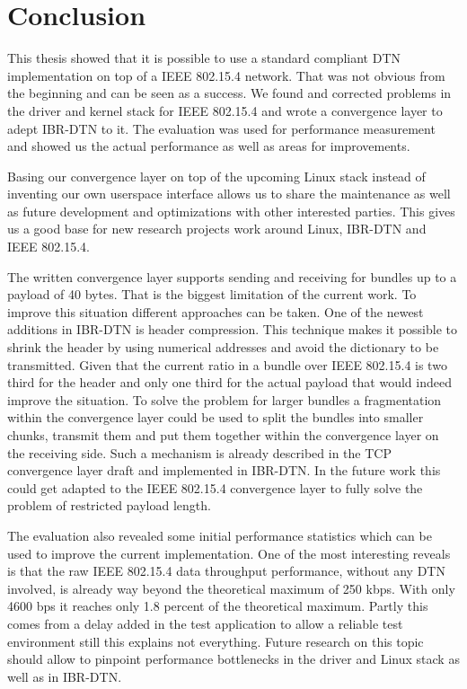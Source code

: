 \chapter{Conclusion}

This thesis showed that it is possible to use a standard compliant DTN
implementation on top of a IEEE 802.15.4 network. That was not obvious from the
beginning and can be seen as a success. We found and corrected problems in the
driver and kernel stack for IEEE 802.15.4 and wrote a convergence layer to adept
IBR-DTN to it. The evaluation was used for performance measurement and showed us
the actual performance as well as areas for improvements.

Basing our convergence layer on top of the upcoming Linux stack instead of
inventing our own userspace interface allows us to share the maintenance as well
as future development and optimizations with other interested parties. This
gives us a good base for new research projects work around Linux, IBR-DTN and
IEEE 802.15.4.

The written convergence layer supports sending and receiving for bundles up to a
payload of 40 bytes. That is the biggest limitation of the current work. To
improve this situation different approaches can be taken. One of the newest
additions in IBR-DTN is header compression. This technique makes it possible to
shrink the header by using numerical addresses and avoid the dictionary to be
transmitted. Given that the current ratio in a bundle over IEEE 802.15.4 is two
third for the header and only one third for the actual payload that would indeed
improve the situation. To solve the problem for larger bundles a fragmentation
within the convergence layer could be used to split the bundles into smaller
chunks, transmit them and put them together within the convergence layer on the
receiving side. Such a mechanism is already described in the TCP convergence
layer draft \cite{tcp-clayer-draft} and implemented in IBR-DTN. In the future
work this could get adapted to the IEEE 802.15.4 convergence layer to fully
solve the problem of restricted payload length.

The evaluation also revealed some initial performance statistics which can be
used to improve the current implementation. One of the most interesting reveals
is that the raw IEEE 802.15.4 data throughput performance, without any DTN
involved, is already way beyond the theoretical maximum of 250 kbps. With only
4600 bps it reaches only 1.8 percent of the theoretical maximum. Partly this
comes from a delay added in the test application to allow a reliable test
environment still this explains not everything. Future research on this topic
should allow to pinpoint performance bottlenecks in the driver and Linux stack
as well as in IBR-DTN.
